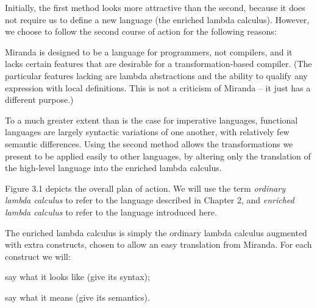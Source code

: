 Initially, the first method looks more attractive than the second, because it does not require us to define a new language (the enriched lambda calculus). However, we choose to follow the second course of action for the following reasons:

\begin{numbered}
    \item Miranda is designed to be a language for programmers, not compilers, and it lacks certain features that are desirable for a transformation-based compiler. (The particular features lacking are lambda abstractions and the ability to qualify any expression with local definitions. This is not a criticism of Miranda -- it just has a different purpose.)

    \item To a much greater extent than is the case for imperative languages, functional languages are largely syntactic variations of one another, with relatively few semantic differences. Using the second method allows the transformations we present to be applied easily to other languages, by altering only the translation of the high-level language into the enriched lambda calculus.
\end{numbered}

Figure 3.1 depicts the overall plan of action. We will use the term \textit{ordinary lambda calculus} to refer to the language described in Chapter 2, and \textit{enriched lambda calculus} to refer to the language introduced here.

The enriched lambda calculus is simply the ordinary lambda calculus augmented with extra constructs, chosen to allow an easy translation from Miranda. For each construct we will:

\begin{numbered}
    \item say what it looks like (give its syntax);
    \item say what it means (give its semantics).
\end{numbered}

